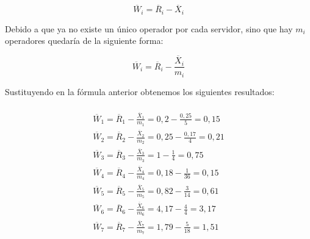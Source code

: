 \begin{equation}
\overline{W}_{i} = \overline{R}_{i} - \overline{X}_{i}
\end{equation}

Debido a que ya no existe un único operador por cada servidor, sino que hay $m_{i}$ operadores quedaría de la siguiente forma:

\begin{equation}
\overline{W}_{i} = \overline{R}_{i} - \frac{\overline{X}_{i}}{m_{i}}
\end{equation}

Sustituyendo en la fórmula anterior obtenemos los siguientes resultados:

\begin{multline}\\
\overline{W}_{1} = \overline{R}_{1} - \frac{\overline{X}_{1}}{m_{1}} = 0,2 - \frac{0,25}{5} = 0,15\\
\overline{W}_{2} = \overline{R}_{2} - \frac{\overline{X}_{2}}{m_{2}} = 0,25 - \frac{0,17}{4} = 0,21\\
\overline{W}_{3} = \overline{R}_{3} - \frac{\overline{X}_{3}}{m_{3}} = 1 - \frac{1}{4} = 0,75\\
\overline{W}_{4} = \overline{R}_{4} - \frac{\overline{X}_{4}}{m_{4}} = 0,18 - \frac{1}{36} = 0,15\\
\overline{W}_{5} = \overline{R}_{5} - \frac{\overline{X}_{5}}{m_{5}} = 0,82 - \frac{3}{14} = 0,61\\
\overline{W}_{6} = \overline{R}_{6} - \frac{\overline{X}_{6}}{m_{6}} = 4,17 - \frac{4}{4} = 3,17\\
\overline{W}_{7} = \overline{R}_{7} - \frac{\overline{X}_{7}}{m_{7}} = 1,79 - \frac{5}{18} = 1,51\\
\end{multline}